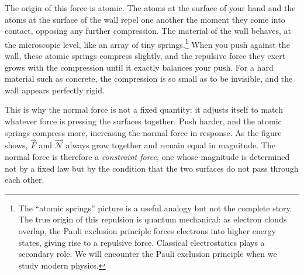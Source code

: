 The origin of this force is atomic. The atoms at the surface of your hand and the
atoms at the surface of the wall repel one another the moment they come into contact,
opposing any further compression. The material of the wall behaves, at the microscopic
level, like an array of tiny springs.\footnote{The ``atomic springs'' picture is a
useful analogy but not the complete story. The true origin of this repulsion is quantum
mechanical: as electron clouds overlap, the Pauli exclusion principle forces electrons
into higher energy states, giving rise to a repulsive force. Classical electrostatics
plays a secondary role. We will encounter the Pauli exclusion principle when we study
modern physics.} When you push against the wall, these atomic springs compress
slightly, and the repulsive force they exert grows with the compression until it exactly
balances your push. For a hard material such as concrete, the compression is so small
as to be invisible, and the wall appears perfectly rigid.

This is why the normal force is not a fixed quantity: it adjusts itself to match whatever
force is pressing the surfaces together. Push harder, and the atomic springs compress
more, increasing the normal force in response. As the figure shows, $\vec{F}$ and
$\vec{\mathscr{N}}$ always grow together and remain equal in magnitude. The normal force is
therefore a \textit{constraint force}, one whose magnitude is determined not by a fixed
law but by the condition that the two surfaces do not pass through each other.


